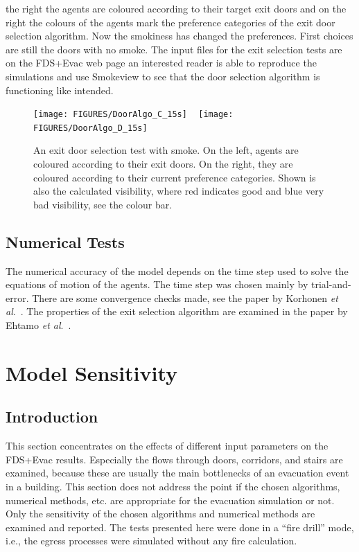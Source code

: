 \documentclass[12pt,a4paper,final,twoside]{stylevk}
\begin{document}
\begin{enumerate}
  the right the agents are coloured according to their target exit
  doors and on the right the colours of the agents mark the preference
  categories of the exit door selection algorithm.  Now the smokiness
  has changed the preferences.  First choices are still the doors with
  no smoke.  The input files for the exit selection tests are on the
  FDS+Evac web page an interested reader is able to reproduce the
  simulations and use Smokeview to see that the door selection
  algorithm is functioning like intended.
%
\begin{figure}[!tb]
  \centerline{\texttt{[image: FIGURES/DoorAlgo\_C\_15s]} ~ \texttt{[image: FIGURES/DoorAlgo\_D\_15s]}}  
  \caption{An exit door selection test with smoke.  On the left,
    agents are coloured according to their exit doors. On the right,
    they are coloured according to their current preference
    categories.  Shown is also the calculated visibility, where red
    indicates good and blue very bad visibility, see the colour
    bar.}\label{Fig_ExitDoorSmoke}
\end{figure}
%
%
\end{enumerate}
%


\section{Numerical Tests}\label{Sec_NumTest}

\noindent The numerical accuracy of the model depends on the time step
used to solve the equations of motion of the agents.  The time step
was chosen mainly by trial-and-error.  There are some convergence
checks made, see the paper by Korhonen \emph{et
  al}.~\cite{Korhonen08b}.  The properties of the exit selection
algorithm are examined in the paper by Ehtamo \emph{et
  al}.~\cite{Ehtamo2010}.

\clearpage

\newpage


\chapter{Model Sensitivity}\label{Sec_ModelSensi}


\section{Introduction}

\noindent This section concentrates on the effects of different input
parameters on the FDS+Evac results.  Especially the flows through
doors, corridors, and stairs are examined, because these are usually
the main bottlenecks of an evacuation event in a building.  This
section does not address the point if the chosen algorithms, numerical
methods, etc.  are appropriate for the evacuation simulation or
not.  Only the sensitivity of the chosen algorithms and numerical
methods are examined and reported.  The tests presented here were done
in a ``fire drill'' mode, i.e., the egress processes were
simulated without any fire calculation.
\end{document}
